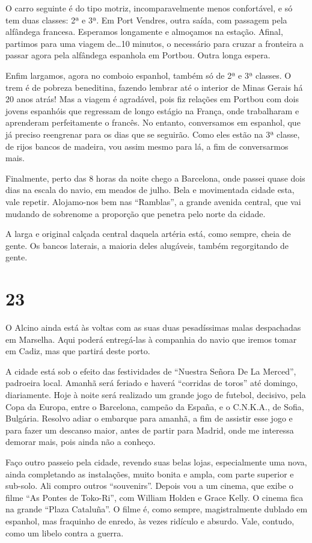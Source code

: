O carro seguinte é do tipo motriz, incomparavelmente menos confortável, e só tem duas classes: 2ª e 3ª. Em Port Vendres, outra saída, com passagem pela alfândega francesa. Esperamos longamente e almoçamos na estação. Afinal, partimos para uma viagem de\ldots 10 minutos, o necessário para cruzar a fronteira a passar agora pela alfândega espanhola em Portbou. Outra longa espera.

Enfim largamos, agora no comboio espanhol, também só de 2ª e 3ª classes. O trem é de pobreza beneditina, fazendo lembrar até o interior de Minas Gerais há 20 anos atrás! Mas a viagem é agradável, pois fiz relações em Portbou com dois jovens espanhóis que regressam de longo estágio na França, onde trabalharam e aprenderam perfeitamente o francês. No entanto, conversamos em espanhol, que já preciso reengrenar para os dias que se seguirão. Como eles estão na 3ª classe, de rijos bancos de madeira, vou assim mesmo para lá, a fim de conversarmos mais.

Finalmente, perto das 8 horas da noite chego a Barcelona, onde passei quase dois dias na escala do navio, em meados de julho. Bela e movimentada cidade esta, vale repetir. Alojamo-nos bem nas “Ramblas”, a grande avenida central, que vai mudando de sobrenome a proporção que penetra pelo norte da cidade.

A larga e original calçada central daquela artéria está, como sempre, cheia de gente. Os bancos laterais, a maioria deles alugáveis, também regorgitando de gente.

\section*{23 \adfflatleafright {}}
O Alcino ainda está às voltas com as suas duas pesadíssimas malas despachadas em Marselha. Aqui poderá entregá-las à companhia do navio que iremos tomar em Cadiz, mas que partirá deste porto.

A cidade está sob o efeito das festividades de “Nuestra Señora De La Merced”, padroeira local. Amanhã será feriado e haverá “corridas de toros” até domingo, diariamente. Hoje à noite será realizado um grande jogo de futebol, decisivo, pela Copa da Europa, entre o Barcelona, campeão da España, e o C.N.K.A., de Sofia, Bulgária. Resolvo adiar o embarque para amanhã, a fim de assistir esse jogo e para fazer um descanso maior, antes de partir para Madrid, onde me interessa demorar mais, pois ainda não a conheço.

Faço outro passeio pela cidade, revendo suas belas lojas, especialmente uma nova, ainda completando as instalações, muito bonita e ampla, com parte superior e sub-solo. Ali compro outros “souvenirs”. Depois vou a um cinema, que exibe o filme “As Pontes de Toko-Ri”, com William Holden e Grace Kelly. O cinema fica na grande “Plaza Cataluña”. O filme é, como sempre, magistralmente dublado em espanhol, mas fraquinho de enredo, às vezes ridículo e absurdo. Vale, contudo, como um libelo contra a guerra.

